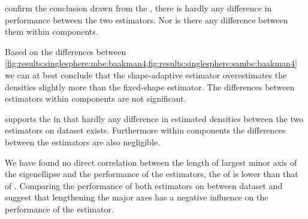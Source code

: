 		 confirm the conclusion drawn from the \MSE, there is hardly any difference in performance between the two estimators. 
		Nor is there any difference between them within components.

		Based on the differences between \cref{fig:results:singlesphere:mbe:baakman4,fig:results:singlesphere:sambe:baakman4} we can at best conclude that the shape-adaptive estimator overestimates the densities slightly more than the fixed-shape estimator. 
		The differences between estimators within components are not significant.

		 supports the \MSE in that hardly any difference in estimated densities between the two estimators on dataset \baakmanFive exists. 
		Furthermore within components the differences between the estimators are also negligible. 

		We have found no direct correlation between the length of largest minor axis of the eigenellipse and the performance of the estimators, \eg the \MSE of \baakmanFour is lower than that of \baakmanOne. 
		Comparing the performance of both estimators on between dataset \ferdosiOne and \baakmanFive suggest that lengthening the major axes has a negative influence on the performance of the estimator. 
